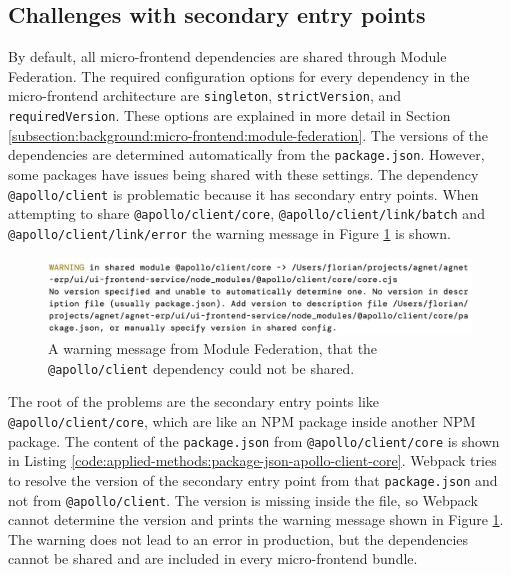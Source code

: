 \subsection{Challenges with secondary entry points}\label{subsection:applied-methods:prototypical-implementation:sharing
-secondary-entrypoints}

By default, all micro-frontend dependencies are shared through Module Federation. The required configuration options for every dependency in the micro-frontend architecture are \texttt{singleton}, \texttt{strictVersion}, and \texttt{requiredVersion}. These options are explained in more detail in Section \ref{subsection:background:micro-frontend:module-federation}. The versions of the dependencies are determined automatically from the \texttt{package.json}. However, some packages have issues being shared with these settings. The dependency \texttt{@apollo/client} is problematic because it has secondary entry points. When attempting to share \texttt{@apollo/client/core}, \texttt{@apollo/client/link/batch} and \texttt{@apollo/client/link/error} the warning message in Figure \ref{fig:applied-methods:sharing-secondary-entrypoints-error} is shown.

\ifshowImages
\begin{figure}[H]
  \centering
  \includegraphics[width=1\linewidth]{images/applied-methods/prototypical-implementation/module-federation-apollo-warning.jpg}
  \caption{A warning message from Module Federation, that the \texttt{@apollo/client} dependency could not be shared.}\label{fig:applied-methods:sharing-secondary-entrypoints-error}
\end{figure}
\fi

\noindent The root of the problems are the secondary entry points like \texttt{@apollo/client/core}, which are like an \ac{NPM} package inside another \ac{NPM} package. The content of the \texttt{package.json} from \texttt{@apollo/client/core} is shown in Listing \ref{code:applied-methods:package-json-apollo-client-core}. Webpack tries to resolve the version of the secondary entry point from that \texttt{package.json} and not from \texttt{@apollo/client}. The version is missing inside the file, so Webpack cannot determine the version and prints the warning message shown in Figure \ref{fig:applied-methods:sharing-secondary-entrypoints-error}. The warning does not lead to an error in production, but the dependencies cannot be shared and are included in every micro-frontend bundle.

